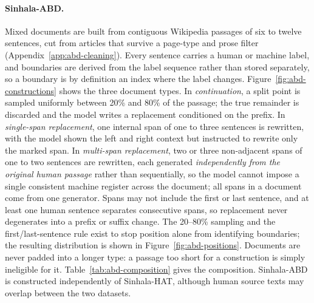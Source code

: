 \paragraph{Sinhala-ABD.}
Mixed documents are built from contiguous Wikipedia passages of six to twelve
sentences, cut from articles that survive a page-type and prose filter
(Appendix~\ref{app:abd-cleaning}). Every sentence carries a human or machine
label, and boundaries are derived from the label sequence rather than stored
separately, so a boundary is by definition an index where the label changes.
Figure~\ref{fig:abd-constructions} shows the three document types.
In \emph{continuation}, a split point is sampled uniformly between 20\% and 80\%
of the passage; the true remainder is discarded and the model writes a
replacement conditioned on the prefix. In \emph{single-span replacement}, one
internal span of one to three sentences is rewritten, with the model shown the
left and right context but instructed to rewrite only the marked span. In
\emph{multi-span replacement}, two or three non-adjacent spans of one to two
sentences are rewritten, each generated \emph{independently from the original
human passage} rather than sequentially, so the model cannot impose a single
consistent machine register across the document; all spans in a document come
from one generator. Spans may not include the first or last sentence, and at
least one human sentence separates consecutive spans, so replacement never
degenerates into a prefix or suffix change. The 20--80\% sampling and the
first/last-sentence rule exist to stop position alone from identifying
boundaries; the resulting distribution is shown in
Figure~\ref{fig:abd-positions}. Documents are never padded into a longer type:
a passage too short for a construction is simply ineligible for it.
Table~\ref{tab:abd-composition} gives the composition. Sinhala-ABD is
constructed independently of Sinhala-HAT, although human source texts may
overlap between the two datasets.


